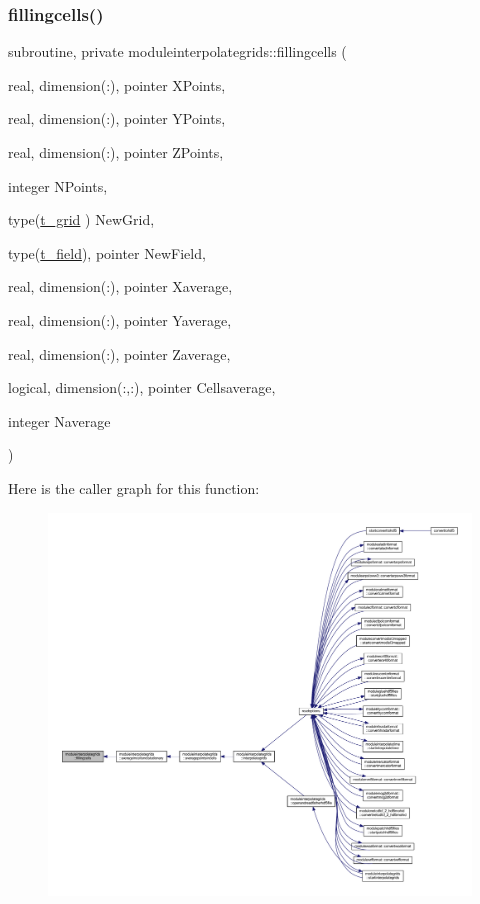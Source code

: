 \subsubsection{\texorpdfstring{fillingcells()}{fillingcells()}}
{\footnotesize\ttfamily subroutine, private moduleinterpolategrids\+::fillingcells (\begin{DoxyParamCaption}\item[{real, dimension(\+:), pointer}]{X\+Points,  }\item[{real, dimension(\+:), pointer}]{Y\+Points,  }\item[{real, dimension(\+:), pointer}]{Z\+Points,  }\item[{integer}]{N\+Points,  }\item[{type(\mbox{\hyperlink{structmoduleinterpolategrids_1_1t__grid}{t\+\_\+grid}} )}]{New\+Grid,  }\item[{type(\mbox{\hyperlink{structmoduleinterpolategrids_1_1t__field}{t\+\_\+field}}), pointer}]{New\+Field,  }\item[{real, dimension(\+:), pointer}]{Xaverage,  }\item[{real, dimension(\+:), pointer}]{Yaverage,  }\item[{real, dimension(\+:), pointer}]{Zaverage,  }\item[{logical, dimension(\+:,\+:), pointer}]{Cellsaverage,  }\item[{integer}]{Naverage }\end{DoxyParamCaption})\hspace{0.3cm}{\ttfamily [private]}}

Here is the caller graph for this function\+:\nopagebreak
\begin{figure}[H]
\begin{center}
\leavevmode
\includegraphics[width=350pt]{namespacemoduleinterpolategrids_aa49617b962704e0850c47dd72be5a154_icgraph}
\end{center}
\end{figure}
\mbox{\label{namespacemoduleinterpolategrids_aa5a71ded8a9f342c24142a855b130d48}} 
